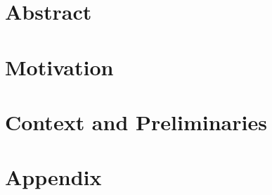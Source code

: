 \documentclass[
	11pt, 
	a4paper, 
	twoside, 
	openright, 
	titlepage=firstiscover, 
	numbers=noenddot, 
	BCOR=12mm,
	headsepline,
	footsepline,
	toc=listof,
	toc=bibliography
	]{scrbook}
\begin{document}

	
	
	
	
\cleardoublepage
{}
	
	\chapter*{Abstract}
	\Blindtext[2][2]
	
	\tableofcontents

\cleardoublepage
{} 

	\chapter{Motivation}
	\Blindtext[2][2]
	
	\chapter{Context and Preliminaries}
	\Blindtext[2][2]\cite{al-kodmany_sentient_2012}
	
	
\cleardoublepage
{}
	
	\appendix
	
	\chapter{Appendix}
	\Blindtext[2][2]
	
	
	
	
	\renewcommand{\listtheoremname}{List of Definitions}
	\listoftheorems[ignoreall,show={definition}]
	\listoffigures
	\listoftables
	\renewcommand{\lstlistlistingname}{List of \lstlistingname s}
	\lstlistoflistings	
	\renewcommand{\listtheoremname}{List of Formulas}
	\listoftheorems[ignoreall,show={formula}]
	\printbibliography %
\end{document}
